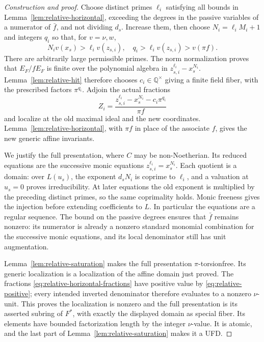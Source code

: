 \documentclass[10pt,a4paper]{amsart}
\begin{document}
\begin{proof}[Construction and proof]
Choose distinct primes \(\ell_i\) satisfying all bounds in
Lemma~\ref{lem:relative-horizontal}, exceeding the degrees in the
passive variables of a numerator of \(\bar f\), and not dividing
\(d_s\).  Increase them, then choose \(N_i=\ell_iM_i+1\)
and integers \(q_i\) so that, for \(v=\nu,w\),
\begin{equation}\label{eq:relative-positive}
N_iv(x_s)>\ell_i v(z_{s,i}),\quad
 q_i>\ell_i v(z_{s,i})>v(\pi f).
\end{equation}
There are arbitrarily large permissible primes.  The norm
normalization proves that \(E_F/fE_F\) is finite over the
polynomial algebra in \(z_{s,i}^{\ell_i}-x_s^{N_i}\).
Lemma~\ref{lem:relative-hit} therefore chooses
\(c_i\in\mathbb Q^\times\) giving a finite field fiber, with
the prescribed factors \(\pi^{q_i}\).  Adjoin the actual fractions
\begin{equation}\label{eq:relative-horizontal-fractions}
Z_i=\frac{z_{s,i}^{\ell_i}-x_s^{N_i}-c_i\pi^{q_i}}{\pi f}
\end{equation}
and localize at the old maximal ideal and the new coordinates.
Lemma~\ref{lem:relative-horizontal}, with \(\pi f\) in place
of the associate \(f\), gives the new generic affine invariants.

We justify the full presentation, where \(C\) may be
non-Noetherian.  Its reduced equations are the successive monic
equations \(z_{s,i}^{\ell_i}=x_s^{N_i}\).  Each quotient is a
domain: over \(L(u_s)\), the exponent \(d_sN_i\) is coprime
to \(\ell_i\), and a valuation at \(u_s=0\) proves
irreducibility.  At later equations the old exponent is multiplied
by the preceding distinct primes, so the same coprimality holds.
Monic freeness gives the injection before extending coefficients
to \(L\).  In particular the equations are a regular sequence.
The bound on the passive degrees ensures that \(\bar f\) remains
nonzero: its numerator is already a nonzero standard monomial
combination for the successive monic equations, and its local
denominator still has unit augmentation.

Lemma~\ref{lem:relative-saturation} makes the full presentation
\(\pi\)-torsionfree.  Its generic localization is a localization
of the affine domain just proved.  The fractions
\eqref{eq:relative-horizontal-fractions} have positive value by
\eqref{eq:relative-positive}; every intended inverted denominator
therefore evaluates to a nonzero \(\nu\)-unit.  This proves the
localization is nonzero and the full presentation is its asserted
subring of \(F^*\), with exactly the displayed domain as special
fiber.  Its elements have bounded factorization length by the
integer \(\nu\)-value.  It is atomic, and the last part of
Lemma~\ref{lem:relative-saturation} makes it a UFD.


\end{proof}
\end{document}
